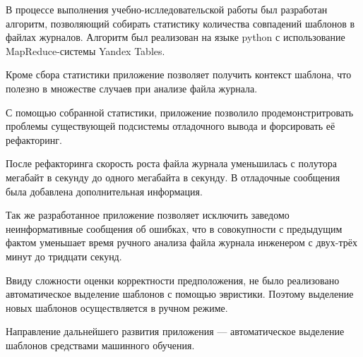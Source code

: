 В процессе выполнения учебно-ислледовательской работы был разработан
алгоритм, позволяющий собирать статистику количества совпадений шаблонов
в файлах журналов.
Алгоритм был реализован на языке python с использование MapReduce-системы
Yandex Tables.

Кроме сбора статистики приложение позволяет получить контекст шаблона,
что полезно в множестве случаев при анализе файла журнала.

С помощью собранной статистики, приложение позволило продемонстритровать
проблемы существующей подсистемы отладочного вывода и форсировать её
рефакторинг.

После рефакторинга скорость роста файла журнала уменьшилась с полутора мегабайт
в секунду до одного мегабайта в секунду. В отладочные сообщения была добавлена
дополнительная информация.

Так же разработанное приложение позволяет исключить заведомо неинформативные
сообщения об ошибках, что в совокупности с предыдущим фактом уменьшает время
ручного анализа файла журнала инженером с двух-трёх минут до тридцати секунд.

Ввиду сложности оценки корректности предположения, не было реализовано
автоматическое выделение шаблонов с помощью эвристики. Поэтому выделение новых
шаблонов осуществляется в ручном режиме.

Направление дальнейшего развития приложения --- автоматическое выделение
шаблонов средствами машинного обучения.
